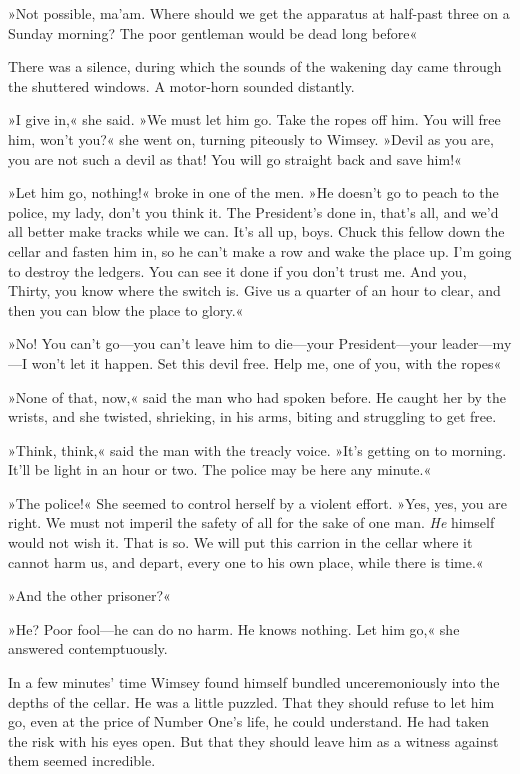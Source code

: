 »Not possible, ma'am. Where should we get the apparatus at half-past three on a Sunday morning? The poor gentleman would be dead long before\longdash«

There was a silence, during which the sounds of the wakening day came through the shuttered windows. A motor-horn sounded distantly.

»I give in,« she said. »We must let him go. Take the ropes off him. You will free him, won't you?« she went on, turning piteously to Wimsey. »Devil as you are, you are not such a devil as that! You will go straight back and save him!«

»Let him go, nothing!« broke in one of the men. »He doesn't go to peach to the police, my lady, don't you think it. The President's done in, that's all, and we'd all better make tracks while we can. It's all up, boys. Chuck this fellow down the cellar and fasten him in, so he can't make a row and wake the place up. I'm going to destroy the ledgers. You can see it done if you don't trust me. And you, Thirty, you know where the switch is. Give us a quarter of an hour to clear, and then you can blow the place to glory.«

»No! You can't go—you can't leave him to die—your President—your leader—my—I won't let it happen. Set this devil free. Help me, one of you, with the ropes\longdash«

»None of that, now,« said the man who had spoken before. He caught her by the wrists, and she twisted, shrieking, in his arms, biting and struggling to get free.

»Think, think,« said the man with the treacly voice. »It's getting on to morning. It'll be light in an hour or two. The police may be here any minute.«

»The police!« She seemed to control herself by a violent effort. »Yes, yes, you are right. We must not imperil the safety of all for the sake of one man. \textit{He} himself would not wish it. That is so. We will put this carrion in the cellar where it cannot harm us, and depart, every one to his own place, while there is time.«

»And the other prisoner?«

»He? Poor fool—he can do no harm. He knows nothing. Let him go,« she answered contemptuously.

In a few minutes' time Wimsey found himself bundled unceremoniously into the depths of the cellar. He was a little puzzled. That they should refuse to let him go, even at the price of Number One's life, he could understand. He had taken the risk with his eyes open. But that they should leave him as a witness against them seemed incredible.

